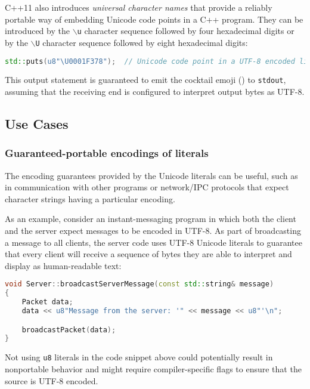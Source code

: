 \noindent C++11 also introduces \emph{universal character names} that provide a
reliably portable way of embedding Unicode code points in a C++ program.
They can be introduced by the \texttt{$\backslash$u} character
sequence followed by four hexadecimal digits or by the
\texttt{$\backslash$U} character sequence followed by eight
hexadecimal digits:

\begin{lstlisting}[language=C++]
std::puts(u8"\U0001F378");  // Unicode code point in a UTF-8 encoded literal
\end{lstlisting}
    
\noindent This output statement is guaranteed to emit the cocktail emoji
(\martini) to \texttt{stdout}, assuming that the receiving end is configured to
interpret output bytes as UTF-8.

\subsection[Use Cases]{Use Cases}\label{use-cases}

\subsubsection[Guaranteed-portable encodings of literals]{Guaranteed-portable encodings of literals}\label{guaranteed-portable-encodings-of-literals}

The encoding guarantees provided by the Unicode literals can be useful,
such as in communication with other programs or network/IPC protocols that
expect character strings having a particular encoding.

As an example, consider an instant-messaging program in which both the
client and the server expect messages to be encoded in UTF-8. As part of
broadcasting a message to all clients, the server code uses UTF-8
Unicode literals to guarantee that every client will receive a sequence
of bytes they are able to interpret and display as human-readable text:

\begin{lstlisting}[language=C++]
void Server::broadcastServerMessage(const std::string& message)
{
    Packet data;
    data << u8"Message from the server: '" << message << u8"'\n";

    broadcastPacket(data);
}
\end{lstlisting}
    
\noindent Not using \texttt{u8} literals in the code snippet above could potentially result in
nonportable behavior and might require compiler-specific flags to
ensure that the source is UTF-8 encoded.

